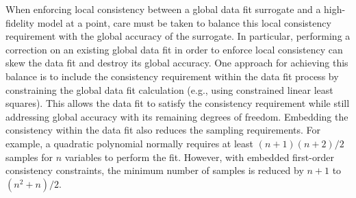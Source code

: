 When enforcing local consistency between a global data fit surrogate
and a high-fidelity model at a point, care must be taken to balance
this local consistency requirement with the global accuracy of the
surrogate.  In particular, performing a correction on an existing
global data fit in order to enforce local consistency can skew the
data fit and destroy its global accuracy.  One approach for achieving
this balance is to include the consistency requirement within the data
fit process by constraining the global data fit calculation (e.g.,
using constrained linear least squares).  This allows the data fit to
satisfy the consistency requirement while still addressing global
accuracy with its remaining degrees of freedom.
Embedding the consistency within the data fit also reduces the
sampling requirements.  For example, a quadratic polynomial normally
requires at least $(n+1)(n+2)/2$ samples for $n$ variables to perform
the fit.  However, with embedded first-order consistency constraints,
the minimum number of samples is reduced by $n+1$ to $(n^2+n)/2$.


